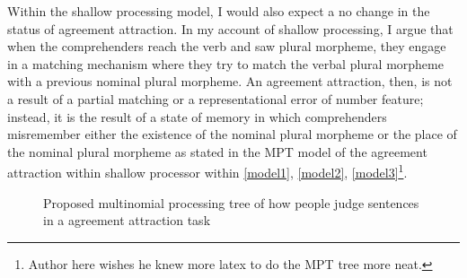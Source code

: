 \documentclass[doc]{apa6}
\let\rmarkdownfootnote\footnote%
\def\footnote{\protect\rmarkdownfootnote}
\begin{document}
Within the shallow processing model, I would also expect a no change in the status of agreement attraction. In my account of shallow processing, I argue that when the comprehenders reach the verb and saw plural morpheme, they engage in a matching mechanism where they try to match the verbal plural morpheme with a previous nominal plural morpheme. An agreement attraction, then, is not a result of a partial matching or a representational error of number feature; instead, it is the result of a state of memory in which comprehenders misremember either the existence of the nominal plural morpheme or the place of the nominal plural morpheme as stated in the MPT model of the agreement attraction within shallow processor within \autoref{model1}, \autoref{model2}, \autoref{model3}\footnote{Author here wishes he knew more latex to do the MPT tree more neat.}.

\begin{figure}[htb!]
\centering
{}
\caption{Proposed multinomial processing tree of how people judge sentences in a agreement attraction task}
\label{model1}
\end{figure}
\end{document}
